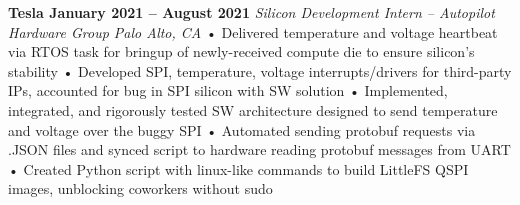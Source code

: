 \documentclass[../main.tex]{subfiles}
\begin{document}
%
\noindent\textbf{{\fontsize{\textFontSize}{\textFontBox}\selectfont Tesla \hfill January 2021 – August 2021}}
\vspace{1mm}\newline
%
%
{\fontsize{\textFontSize}{\textFontBox}\selectfont\emph{Silicon Development Intern – Autopilot Hardware Group \hfill Palo Alto, CA \hspace{0 cm}}}
\vspace{-0mm}\newline
%
%
{\fontsize{\textFontSize}{\textFontBox}\selectfont • \hspace{1mm} Delivered temperature and voltage heartbeat via RTOS task for bringup of newly-received compute die to ensure silicon's stability }\newline
{\fontsize{\textFontSize}{\textFontBox}\selectfont • \hspace{1mm} Developed SPI, temperature, voltage interrupts/drivers for third-party IPs, accounted for bug in SPI silicon with SW solution }\newline
{\fontsize{\textFontSize}{\textFontBox}\selectfont • \hspace{1mm} Implemented, integrated, and rigorously tested SW architecture designed to send temperature and voltage over the buggy SPI }\newline
{\fontsize{\textFontSize}{\textFontBox}\selectfont • \hspace{1mm} Automated sending protobuf requests via .JSON files and synced script to hardware reading protobuf messages from UART }\newline
{\fontsize{\textFontSize}{\textFontBox}\selectfont • \hspace{1mm} Created Python script with linux-like commands to build LittleFS QSPI images, unblocking coworkers without sudo }\vspace{2mm}\newline
\vspace{-7mm}\newline
%
%
\end{document}
